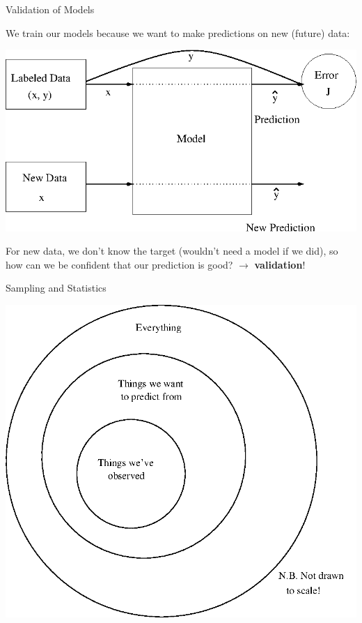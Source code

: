 \documentclass[12pt,t]{beamer}
\begin{document}
\begin{frame}{Validation of Models}

We train our models because we want to make predictions on new (future) data:
\centerline{
\includegraphics[height=0.55\textheight]{images/need_validation.png}
}

\noindent
For new data, we don't know the target (wouldn't need a model if we did), so how can we be confident that our prediction is good?
$\longrightarrow$ {\bf validation}!
\end{frame}

\begin{frame}{Sampling and Statistics} 
\centerline{
\includegraphics[height=0.75\textheight]{images/populations.png}
}
\end{frame}
\end{document}
